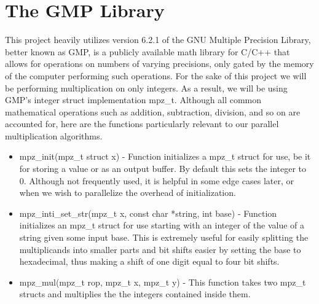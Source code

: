 \documentclass[12pt]{article}
\begin{document}
\section{The GMP Library}
	This project heavily utilizes version 6.2.1 of the GNU Multiple Precision Library, better known as GMP, is a publicly available math library for C/C++ that allows for operations on numbers of varying precisions, only gated by the memory of the computer performing such operations. For the sake of this project we will be performing multiplication on only integers. As a result, we will be using GMP’s integer struct implementation mpz_t. Although all common mathematical operations such as addition, subtraction, division, and so on are accounted for, here are the functions particularly relevant to our parallel multiplication algorithms.\par
	
	\begin{itemize}
		\item mpz_init(mpz_t struct x) - Function initializes a mpz_t struct for use, be it for storing a value or as an output buffer. By default this sets the integer to 0. Although not frequently used, it is helpful in some edge cases later, or when we wish to parallelize the overhead of initialization.
		\item mpz_inti_set_str(mpz_t x, const char *string, int base) - Function initializes an mpz_t struct for use starting with an integer of the value of a string given some input base. This is extremely useful for easily splitting the multiplicands into smaller parts and bit shifts easier by setting the base to hexadecimal, thus making a shift of one digit equal to four bit shifts.
		\item mpz_mul(mpz_t rop, mpz_t x, mpz_t y) - This function takes two mpz_t structs and multiplies the the integers contained inside them.
	\end{itemize}
\end{document}
